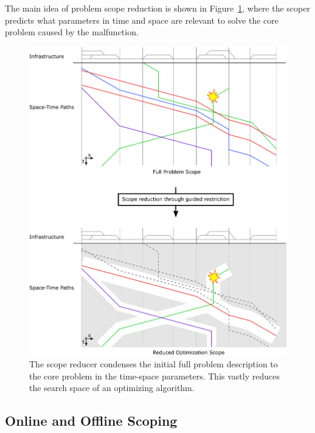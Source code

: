 \documentclass{article}
\begin{document}
The main idea of problem scope reduction is shown in Figure~\ref{fig:introduction_time_space}, where the scoper predicts what parameters in time and space are relevant to solve the core problem caused by the malfunction.

%
\begin{figure}[hbtp]
	\centering
  \includegraphics[width=\textwidth]{Figures/rsp_rescheduling_rsp.pdf}
	\caption{The scope reducer condenses the initial full problem description to the core problem in the time-space parameters. This vastly reduces the search space of an optimizing algorithm.}
	\label{fig:introduction_time_space}
\end{figure}

\subsection{Online and Offline Scoping}\label{subec:online_offline}
\end{document}
